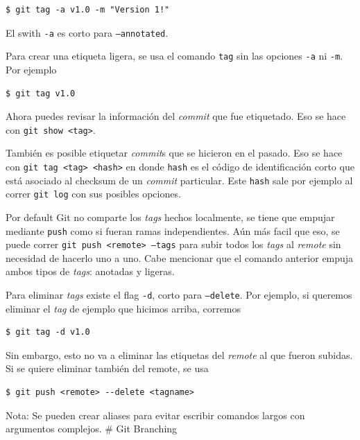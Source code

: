 \documentclass[spanish, 12pt, a4paper]{article}
\begin{document}
\begin{lstlisting}
$ git tag -a v1.0 -m "Version 1!"
\end{lstlisting}

El swith \passthrough{\lstinline!-a!} es corto para
\passthrough{\lstinline!–annotated!}.

Para crear una etiqueta ligera, se usa el comando
\passthrough{\lstinline!tag!} sin las opciones
\passthrough{\lstinline!-a!} ni \passthrough{\lstinline!-m!}. Por
ejemplo

\begin{lstlisting}
$ git tag v1.0
\end{lstlisting}

Ahora puedes revisar la información del \emph{commit} que fue
etiquetado. Eso se hace con \passthrough{\lstinline!git show <tag>!}.

También es posible etiquetar \emph{commit}s que se hicieron en el
pasado. Eso se hace con \passthrough{\lstinline!git tag <tag> <hash>!}
en donde \passthrough{\lstinline!hash!} es el código de identificación
corto que está asociado al checksum de un \emph{commit} particular. Este
\passthrough{\lstinline!hash!} sale por ejemplo al correr
\passthrough{\lstinline!git log!} con sus posibles opciones.

Por default Git no comparte los \emph{tags} hechos localmente, se tiene
que empujar mediante \passthrough{\lstinline!push!} como si fueran ramas
independientes. Aún más facil que eso, se puede correr
\passthrough{\lstinline!git push <remote> –tags!} para subir todos los
\emph{tags} al \emph{remote} sin necesidad de hacerlo uno a uno. Cabe
mencionar que el comando anterior empuja ambos tipos de \emph{tags}:
anotadas y ligeras.

Para eliminar \emph{tags} existe el flag \passthrough{\lstinline!-d!},
corto para \passthrough{\lstinline!–delete!}. Por ejemplo, si queremos
eliminar el \emph{tag} de ejemplo que hicimos arriba, corremos

\begin{lstlisting}
$ git tag -d v1.0
\end{lstlisting}

Sin embargo, esto no va a eliminar las etiquetas del \emph{remote} al
que fueron subidas. Si se quiere eliminar también del remote, se usa

\begin{lstlisting}
$ git push <remote> --delete <tagname>
\end{lstlisting}

Nota: Se pueden crear aliases para evitar escribir comandos largos con
argumentos complejos. \# Git Branching
\end{document}
